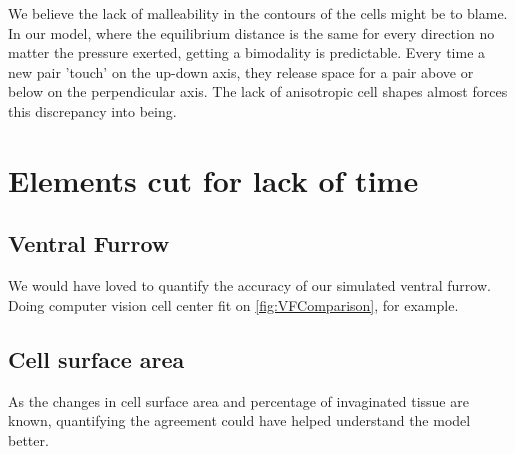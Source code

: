 We believe the lack of malleability in the contours of the cells might be to blame.\\
In our model, where the equilibrium distance is the same for every direction no matter the pressure exerted, getting a bimodality is predictable.
Every time a new pair 'touch' on the up-down axis, they release space for a pair above or below on the perpendicular axis. The lack of anisotropic cell shapes almost forces this discrepancy into being.






\section{Elements cut for lack of time}
\subsection{Ventral Furrow}
We would have loved to quantify the accuracy of our simulated ventral furrow.\\
Doing computer vision cell center fit on \ref{fig:VFComparison}, for example.

\subsection{Cell surface area}
As the changes in cell surface area and percentage of invaginated tissue are known, quantifying the agreement could have helped understand the model better.

